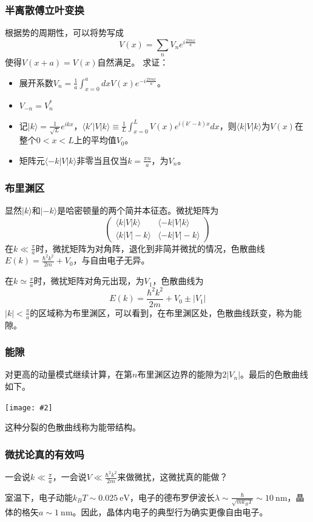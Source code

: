 \documentclass[CJK]{beamer}
\newcommand{\unit}[1]{\mathrm{\ #1}}
\newcommand{\cpic}[2]{
\begin{center}
\texttt{[image: \#2]}
\end{center}
}
\begin{document}
\begin{frame}
\frametitle{\bch 半离散傅立叶变换 \ech}
\bch
根据势的周期性，可以将势写成
$$
V(x) = \sum_n V_n e^{i\frac{2\pi n x}{a}}
$$
使得$V(x+a) = V(x)$自然满足。
求证：
\begin{itemize}
\item 展开系数$V_n = \frac{1}{a} \int_{x=0}^a dx V(x) e^{-i\frac{2\pi n x}{a}}$。
\item $V_{-n} = V_n^*$
\item 记$|k\rangle = \frac{1}{\sqrt{L}}e^{ikx}$，$\langle k' | V | k \rangle \equiv \frac{1}{L} \int_{x=0}^L V(x) e^{i(k'-k)x} dx$，则$\langle k | V | k \rangle$为$V(x)$在整个$0<x<L$上的平均值$V_0$。
\item 矩阵元$\langle -k | V | k \rangle$非零当且仅当$k =\frac{\pi n}{a}$，为$V_n$。
\end{itemize}
\ech
\end{frame}


\begin{frame}
\frametitle{\bch 布里渊区 \ech}
\bch
显然$|k\rangle$和$|-k \rangle$是哈密顿量的两个简并本征态。微扰矩阵为
$$
\begin{pmatrix}
\langle k | V | k \rangle & \langle -k | V | k \rangle \\
\langle k | V | -k \rangle & \langle -k | V | -k \rangle
\end{pmatrix}
$$
在$k \ll \frac{\pi}{a}$时，微扰矩阵为对角阵，退化到非简并微扰的情况，色散曲线$E(k) = \frac{\hbar^2 k^2}{2m} + V_0$，与自由电子无异。
\par
在$k \simeq \frac{\pi}{a}$时，微扰矩阵对角元出现，为$V_1$，色散曲线为
$$
E(k) = \frac{\hbar^2 k^2}{2m} + V_0 \pm |V_1|
$$
$|k| < \frac{\pi}{a}$的区域称为布里渊区，可以看到，在布里渊区处，色散曲线跃变，称为能隙。
\ech
\end{frame}

\begin{frame}
\frametitle{\bch 能隙 \ech}
\bch
对更高的动量模式继续计算，在第$n$布里渊区边界的能隙为$2|V_n|$。最后的色散曲线如下。
\cpic{0.35}{energy_gap}
这种分裂的色散曲线称为能带结构。
\ech
\end{frame}

\begin{frame}
\frametitle{\bch 微扰论真的有效吗 \ech}
\bch
一会说$k \ll \frac{\pi}{a}$，一会说$V \ll \frac{\hbar^2 k^2}{2m}$来做微扰，这微扰真的能做？
\par
室温下，电子动能$k_B T \sim 0.025 \unit{eV}$，电子的德布罗伊波长$\lambda \sim \frac{\hbar} { \sqrt{m k_B T}} \sim 10 \unit{nm}$，晶体的格矢$a\sim 1\unit{nm}$。因此，晶体内电子的典型行为确实更像自由电子。
\ech
\end{frame}
\end{document}
